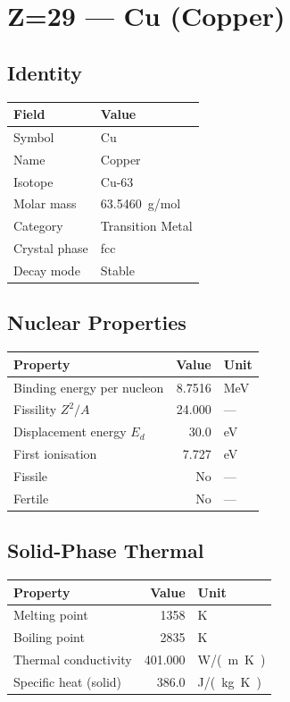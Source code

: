 \documentclass[11pt,a4paper]{article}
\begin{document}
\newpage

\section{Z=29 --- Cu (Copper)}
\label{sec:Z29}

\subsection{Identity}
\begin{tabular}{ll}
  \toprule
  Field & Value \\
  \midrule
  Symbol & Cu \\
  Name & Copper \\
  Isotope & Cu-63 \\
  Molar mass & \SI{63.5460}{g/mol} \\
  Category & Transition Metal \\
  Crystal phase & fcc \\
  Decay mode & Stable \\
  \bottomrule
\end{tabular}

\subsection{Nuclear Properties}
\begin{tabular}{lrl}
  \toprule
  Property & Value & Unit \\
  \midrule
  Binding energy per nucleon & 8.7516 & \si{MeV} \\
  Fissility $Z^2/A$ & 24.000 & --- \\
  Displacement energy $E_d$ & 30.0 & \si{eV} \\
  First ionisation & 7.727 & \si{eV} \\
  Fissile & No & --- \\
  Fertile & No & --- \\
  \bottomrule
\end{tabular}

\subsection{Solid-Phase Thermal}
\begin{tabular}{lrl}
  \toprule
  Property & Value & Unit \\
  \midrule
  Melting point & 1358 & \si{K} \\
  Boiling point & 2835 & \si{K} \\
  Thermal conductivity & 401.000 & \si{W/(m.K)} \\
  Specific heat (solid) & 386.0 & \si{J/(kg.K)} \\
  \bottomrule
\end{tabular}
\end{document}
